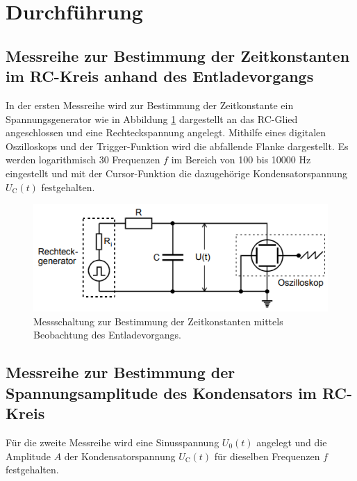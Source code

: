 \section{Durchführung}
\label{sec:Durchführung}

\subsection{Messreihe zur Bestimmung der Zeitkonstanten im RC-Kreis anhand des Entladevorgangs}

In der ersten Messreihe wird zur Bestimmung der Zeitkonstante ein Spannungsgenerator
wie in Abbildung \ref{fig:v353_1} dargestellt an das RC-Glied angeschlossen und eine Rechteckspannung angelegt.
Mithilfe eines digitalen Oszilloskops und der Trigger-Funktion wird die abfallende 
Flanke dargestellt. Es werden logarithmisch 30 Frequenzen $f$ im Bereich von 100 bis 10000
$\si{\hertz}$ eingestellt und mit der Cursor-Funktion die dazugehörige Kondensatorspannung 
$U_\text{C}(t)$ festgehalten.
\begin{figure}[H]
  \centering
  \includegraphics{V353_1.png}
  \caption{Messschaltung zur Bestimmung der Zeitkonstanten mittels Beobachtung des 
  Entladevorgangs. \cite[S. 6]{kent}}
  \label{fig:v353_1}
\end{figure}

\subsection{Messreihe zur Bestimmung der Spannungsamplitude des Kondensators
im RC-Kreis}
Für die zweite Messreihe wird eine Sinusspannung $U_\text{0}(t)$ angelegt und die 
Amplitude $A$ der Kondensatorspannung $U_\text{C}(t)$ für dieselben Frequenzen $f$ festgehalten.

